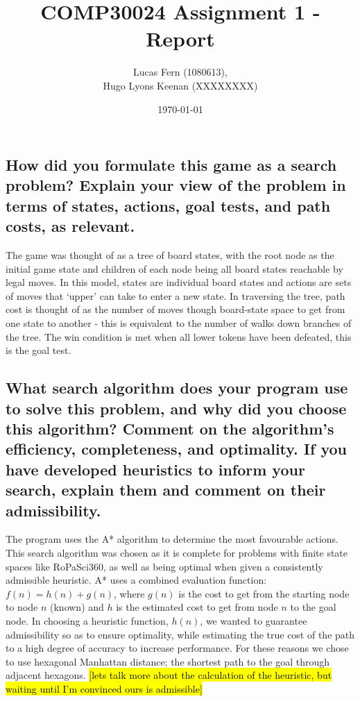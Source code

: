 \documentclass{article}
\title{COMP30024 Assignment 1 - Report}
\date{\today}
\author{Lucas Fern (1080613),\\Hugo Lyons Keenan (XXXXXXXX)}
\begin{document}
\maketitle
\subsection*{How did you formulate this game as a search problem? Explain your view of the problem in terms of states, actions, goal tests, and path costs, as relevant.}
The game was thought of as a tree of board states, with the root node as the initial game state and children of each node being all board states reachable by legal moves. In this model, states are individual board states and actions are sets of moves that ‘upper’ can take to enter a new state. In traversing the tree, path cost is thought of as the number of moves though board-state space to get from one state to another - this is equivalent to the number of walks down branches of the tree. The win condition is met when all lower tokens have been defeated, this is the goal test. 

\subsection*{What search algorithm does your program use to solve this problem, and why did you choose this algorithm? Comment on the algorithm’s efficiency, completeness, and optimality. If you have developed heuristics to inform your search, explain them and comment on their admissibility.}
The program uses the A* algorithm to determine the most favourable actions. This search algorithm was chosen as it is complete for problems with finite state spaces like RoPaSci360, as well as being optimal when given a consistently admissible heuristic. A* uses a combined evaluation function: \(f(n) = h(n) + g(n)\), where \(g(n)\) is the cost to get from the starting node to node $n$ (known) and $h$ is the estimated cost to get from node $n$ to the goal node. In choosing a heuristic function, $h(n)$, we wanted to guarantee admissibility so as to ensure optimality, while estimating the true cost of the path to a high degree of accuracy to increase performance. For these reasons we chose to use hexagonal Manhattan distance; the shortest path to the goal through adjacent hexagons. \hl{[lets talk more about the calculation of the heuristic, but waiting until I'm convinced ours is admissible]}
\end{document}
